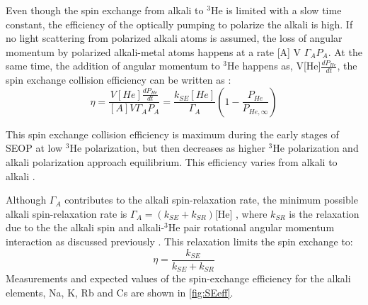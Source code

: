 
Even though the spin exchange from alkali to $^3$He is limited with a slow time constant, the efficiency of the optically pumping to polarize the alkali is high. If no light scattering from polarized alkali atoms is assumed, the loss of angular momentum by polarized alkali-metal atoms happens at a rate [A] V $\Gamma_A P_A$. At the same time, the addition of angular momentum to $^3$He happens as,  V[He]$\frac{dP_{He}}{dt}$, the spin exchange collision efficiency can be written as \cite{Gentile2017, Ben-AmarBaranga1998}:
\begin{equation}
    \eta = \frac{V [He] \frac{dP_{He}}{dt}}{[A] V \Gamma_A P_A} = \frac{k_{SE} [He]}{\Gamma_A} \left (  1- \frac{P_{He}}{P_{He, \infty}}             \right )
\end{equation}

This spin exchange collision efficiency is maximum during the early stages of SEOP at low $^3$He polarization, but then decreases as higher $^3$He polarization and alkali polarization approach equilibrium. This efficiency varies from alkali to alkali \cite{Ben-AmarBaranga1998}.

Although $\Gamma_A$ contributes to the alkali spin-relaxation rate, the minimum possible alkali spin-relaxation rate is $\Gamma_A = (k_{SE} + k_{SR}) $[He] , where $k_{SR}$ is the relaxation due to the the alkali spin and alkali-$^3$He pair rotational angular momentum interaction as discussed previously \cite{Ben-AmarBaranga1998, Borel2003, Singh2010}. This relaxation limits the spin exchange to:
\begin{equation}
    \eta = \frac{k_{SE}}{k_{SE} + k_{SR}}
\end{equation}
Measurements and expected values of the spin-exchange efficiency for the alkali elements, Na, K, Rb and Cs are shown in \cref{fig:SEeff}.

